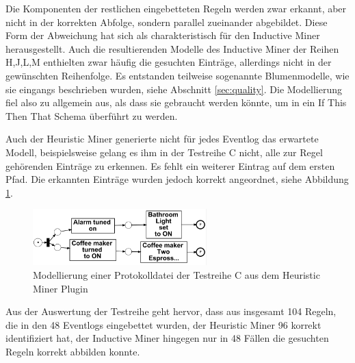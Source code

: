 Die Komponenten der restlichen eingebetteten Regeln werden zwar erkannt, aber nicht in der korrekten Abfolge, sondern parallel zueinander abgebildet. Diese Form der Abweichung hat sich als charakteristisch für den Inductive Miner herausgestellt. Auch die resultierenden Modelle des Inductive Miner der Reihen H,J,L,M enthielten zwar häufig die gesuchten Einträge, allerdings nicht in der gewünschten Reihenfolge. Es entstanden teilweise sogenannte Blumenmodelle, wie sie eingangs beschrieben wurden, siehe Abschnitt \ref{sec:quality}. Die Modellierung fiel also zu allgemein aus, als dass sie gebraucht werden könnte, um in ein If This Then That Schema überführt zu werden.

Auch der Heuristic Miner generierte nicht für jedes Eventlog das erwartete Modell, beispielsweise gelang es ihm in der Testreihe C nicht, alle zur Regel gehörenden Einträge zu erkennen. Es fehlt ein weiterer Eintrag auf dem ersten Pfad. Die erkannten Einträge wurden jedoch korrekt angeordnet, siehe Abbildung \ref{fig:C_heuristic}. 

\begin{figure}[!ht]
    \centering
    \includegraphics[width=0.6\textwidth,]{figures/Appbildungen/C_Heuristic.PNG}
    \caption{Modellierung einer Protokolldatei der Testreihe C aus dem Heuristic Miner Plugin}
    \label{fig:C_heuristic}
\end{figure}

Aus der Auswertung der Testreihe geht hervor, dass aus insgesamt 104 Regeln, die in den 48 Eventlogs eingebettet wurden, der Heuristic Miner 96 korrekt identifiziert hat, der Inductive Miner hingegen nur in 48 Fällen die gesuchten Regeln korrekt abbilden konnte.

\begin{table}[!htbp]
\centering
{}
\caption{Ergebnisse der Auswertung der Versuchsreihe}
\label{tab:results_short}
\end{table}

